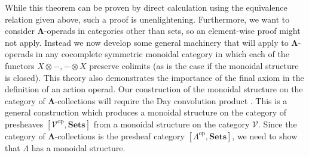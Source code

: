 \documentclass{amsbook} %
\newcommand{\mb}{\mathbf}
\newcommand{\ML}{\mathbf{\Lambda}}
\numberwithin{section}{chapter}
\begin{document}
While this theorem can be proven by direct calculation using the equivalence relation given above, such a proof is unenlightening.  Furthermore, we want to consider $\ML$-operads in categories other than sets, so an element-wise proof might not apply.  Instead we now develop some general machinery that will apply to $\ML$-operads in any cocomplete symmetric monoidal category in which each of  the functors $X \otimes -, - \otimes X$ preserve colimits (as is the case if the monoidal structure is closed).  This theory also demonstrates the importance of the final axiom in the definition of an action operad.  Our construction of the monoidal structure on the category of $\ML$-collections will require the Day convolution product \cite{day-thesis}.  This is a general construction which produces a monoidal structure on the category of presheaves $[\mathcal{V}^{\textrm{op}}, \mb{Sets}]$ from a monoidal structure on the category $\mathcal{V}$.  Since the category of $\ML$-collections is the presheaf category $[\mathbb{\Lambda}^{\textrm{op}}, \mb{Sets}]$, we need to show that $\mathbb{\Lambda}$ has a monoidal structure.
\end{document}
